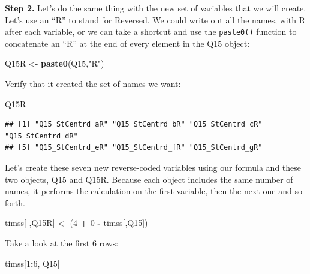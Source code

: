 \documentclass[
]{article}
\newenvironment{Shaded}{\begin{snugshade}}{\end{snugshade}}
\newcommand{\DecValTok}[1]{\textcolor[rgb]{0.00,0.00,0.81}{#1}}
\newcommand{\KeywordTok}[1]{\textcolor[rgb]{0.13,0.29,0.53}{\textbf{#1}}}
\newcommand{\NormalTok}[1]{#1}
\newcommand{\OperatorTok}[1]{\textcolor[rgb]{0.81,0.36,0.00}{\textbf{#1}}}
\newcommand{\StringTok}[1]{\textcolor[rgb]{0.31,0.60,0.02}{#1}}
\begin{document}
\textbf{Step 2.} Let's do the same thing with the new set of variables that we will create. Let's use an ``R'' to stand for Reversed. We could write out all the names, with R after each variable, or we can take a shortcut and use the \texttt{paste0()} function to concatenate an ``R'' at the end of every element in the Q15 object:

\begin{Shaded}
\begin{Highlighting}[]
\NormalTok{Q15R <-}\StringTok{ }\KeywordTok{paste0}\NormalTok{(Q15,}\StringTok{"R"}\NormalTok{)}
\end{Highlighting}
\end{Shaded}

Verify that it created the set of names we want:

\begin{Shaded}
\begin{Highlighting}[]
\NormalTok{Q15R}
\end{Highlighting}
\end{Shaded}

\begin{verbatim}
## [1] "Q15_StCentrd_aR" "Q15_StCentrd_bR" "Q15_StCentrd_cR" "Q15_StCentrd_dR"
## [5] "Q15_StCentrd_eR" "Q15_StCentrd_fR" "Q15_StCentrd_gR"
\end{verbatim}

Let's create these seven new reverse-coded variables using our formula and these two objects, Q15 and Q15R. Because each object includes the same number of names, it performs the calculation on the first variable, then the next one and so forth.

\begin{Shaded}
\begin{Highlighting}[]
\NormalTok{timss[ ,Q15R] <-}\StringTok{ }\NormalTok{(}\DecValTok{4} \OperatorTok{+}\StringTok{ }\DecValTok{0} \OperatorTok{-}\StringTok{ }\NormalTok{timss[,Q15]) }
\end{Highlighting}
\end{Shaded}

Take a look at the first 6 rows:

\begin{Shaded}
\begin{Highlighting}[]
\NormalTok{timss[}\DecValTok{1}\OperatorTok{:}\DecValTok{6}\NormalTok{, Q15]}
\end{Highlighting}
\end{Shaded}
\end{document}
